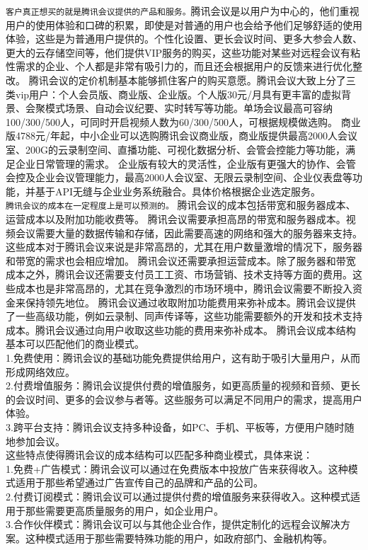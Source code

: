 \documentclass[a4paper,12pt]{article}
\begin{document}
\texttt{客户真正想买的就是腾讯会议提供的产品和服务。}腾讯会议是以用户为中心的，他们重视用户的使用体验和口碑的积累，即使是对普通的用户也会给予他们足够舒适的使用体验，这些是为普通用户提供的。个性化设置、更长会议时间、更多大参会人数、
更大的云存储空间等，他们提供VIP服务的购买，这些功能对某些对远程会议有粘性需求的企业、个人都是非常有吸引力的，而且还会根据用户的反馈来进行优化整改。
腾讯会议的定价机制基本能够抓住客户的购买意愿。腾讯会议大致上分了三类vip用户：个人会员版、商业版、企业版。个人版30元/月具有更丰富的虚拟背景、会聚模式场景、自动会议纪要、实时转写等功能。单场会议最高可容纳100/300/500人，可同时开启视频人数为60/300/500人，可根据规模做选购。
商业版4788元/年起，中小企业可以选购腾讯会议商业版，商业版提供最高2000人会议室、200G的云录制空间、直播功能、可视化数据分析、会管会控能力等功能，满足企业日常管理的需求。
企业版有较大的灵活性，企业版有更强大的协作、会管会控及企业会议管理能力，最高2000人会议室、无限云录制空间、企业仪表盘等功能，并基于API无缝与企业业务系统融合。具体价格根据企业选定服务。\\

\texttt{腾讯会议的成本在一定程度上是可以预测的。}
腾讯会议的成本包括带宽和服务器成本、运营成本以及附加功能收费等。
腾讯会议需要承担高昂的带宽和服务器成本。视频会议需要大量的数据传输和存储，因此需要高速的网络和强大的服务器来支持。这些成本对于腾讯会议来说是非常高昂的，尤其在用户数量激增的情况下，服务器和带宽的需求也会相应增加。
腾讯会议还需要承担运营成本。除了服务器和带宽成本之外，腾讯会议还需要支付员工工资、市场营销、技术支持等方面的费用。这些成本也是非常高昂的，尤其在竞争激烈的市场环境中，腾讯会议需要不断投入资金来保持领先地位。
腾讯会议通过收取附加功能费用来弥补成本。腾讯会议提供了一些高级功能，例如云录制、同声传译等，这些功能需要额外的开发和技术支持成本。腾讯会议通过向用户收取这些功能的费用来弥补成本。
腾讯会议成本结构基本可以匹配他们的商业模式。\\
1.免费使用：腾讯会议的基础功能免费提供给用户，这有助于吸引大量用户，从而形成网络效应。\\
2.付费增值服务：腾讯会议提供付费的增值服务，如更高质量的视频和音频、更长的会议时间、更多的会议参与者等。这些服务可以满足不同用户的需求，提高用户体验。\\
3.跨平台支持：腾讯会议支持多种设备，如PC、手机、平板等，方便用户随时随地参加会议。\\
这些特点使得腾讯会议的成本结构可以匹配多种商业模式，具体来说：\\
1.免费+广告模式：腾讯会议可以通过在免费版本中投放广告来获得收入。这种模式适用于那些希望通过广告宣传自己的品牌和产品的公司。\\
2.付费订阅模式：腾讯会议可以通过提供付费的增值服务来获得收入。这种模式适用于那些需要更高质量服务的用户，如企业用户。\\
3.合作伙伴模式：腾讯会议可以与其他企业合作，提供定制化的远程会议解决方案。这种模式适用于那些需要特殊功能的用户，如政府部门、金融机构等。\\
\end{document}
